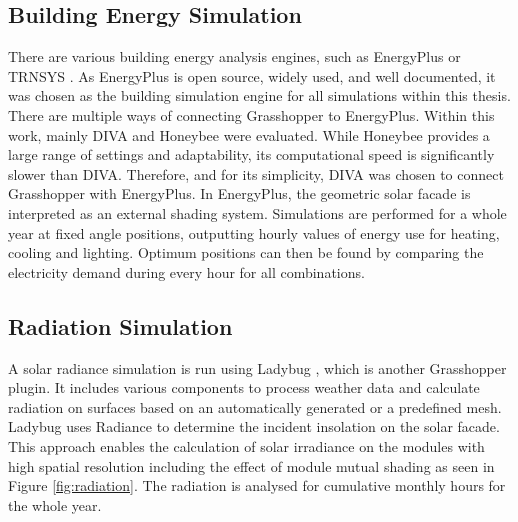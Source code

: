 
		
		\subsection{Building Energy Simulation}
		\label{ss:buildEsim}

			There are various building energy analysis engines, such as EnergyPlus \cite{energyplus} or TRNSYS \cite{trnsys}. As EnergyPlus is open source, widely used, and well documented, it was chosen as the building simulation engine for all simulations within this thesis. There are multiple ways of connecting Grasshopper to EnergyPlus. Within this work, mainly DIVA \cite{DIVA} and Honeybee\cite{roudsari2014ladybug} were evaluated. While Honeybee provides a large range of settings and adaptability, its computational speed is significantly slower than DIVA. Therefore, and for its simplicity, DIVA was chosen to connect Grasshopper with EnergyPlus. In EnergyPlus, the geometric solar facade is interpreted as an external shading system. Simulations are performed for a whole year at fixed angle positions, outputting hourly values of energy use for heating, cooling and lighting. Optimum positions can then be found by comparing the electricity demand during every hour for all combinations. 

		\subsection{Radiation Simulation} 
		\label{ss:radSim}

			A solar radiance simulation is run using Ladybug \cite{roudsari2014ladybug}, which is another Grasshopper plugin. It includes various components to process weather data and calculate radiation on surfaces based on an automatically generated or a predefined mesh. Ladybug uses Radiance \cite{ward1994radiance} to determine the incident insolation on the solar facade. This approach enables the calculation of solar irradiance on the modules with high spatial resolution including the effect of module mutual shading as seen in Figure \ref{fig:radiation}. The radiation is analysed for cumulative monthly hours for the whole year. 


